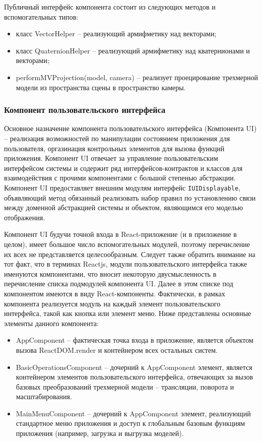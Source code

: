 Публичный интерфейс компонента состоит из следующих методов и вспомогательных типов:
\begin{itemize}
\item класс VectorHelper -- реализующий армифметику над векторами;
\item класс QuaternionHelper -- реализующий армифметику над кватернионами и векторами;
\item performMVProjection(model, camera) -- реализует проецирование трехмерной модели из пространства сцены в пространство камеры.
\end{itemize}

\subsubsection{Компонент пользовательского интерфейса}
\label{sub:theory:components:ui}

Основное назначение компонента пользовательского интерфейса (Компонента UI) -- реализация возможностей по манипулации состоянием приложения для пользователя, оргазинация
контрольных элементов для вызова функций приложения.
Компонент UI отвечает за управление пользовательским интерфейсом системы и содержит ряд интерфейсов-контрактов и классов для взаимодействия с прочими компонентами
с большой степенью абстракции. Компонент UI предоставляет внешним модулям интерфейс \texttt{IUIDisplayable}, объявляющий метод обязанный реализовать набор правил
по установлению связи между доменной абстракцией системы и объектом, являющимся его моделью отображения.

Компонент UI будучи точной входа в React-приложение (и в приложение в целом), имеет большое число вспомогательных модулей, поэтому перечисление их всех не представляется целесообразным.
Следует также обратить внимание на тот факт, что в терминах Reactjs, модули пользовательского интерфейса также именуются компонентами, что вносит некоторую двусмысленность в перечисление списка
подмодулей компонента UI. Далее в этом списке под компонентом имеются в виду React-компоненты. Фактически, в рамках компонента реализуется модуль на каждый элемент пользовательского 
интерфейса, такой как кнопка или элемент меню. Ниже представлены основные элементы данного компонента:

\begin{itemize}
\item AppComponent -- фактическая точка входа в приложение, является объектом вызова ReactDOM.render и контейнером всех остальных систем.
\item BasicOperationsComponent -- дочерний к AppComponent элемент, является контейнером элементов пользовательского интерфейса, отвечающих за вызов базовых преобразований трехмерной
модели -- трансляции, поворота и масштабирования.
\item MainMenuComponent -- дочерний к AppComponent элемент, реализующий стандартное меню приложения и доступ к глобальным базовым функциям приложения (например, загрузка и выгрузка моделей).
\end{itemize}